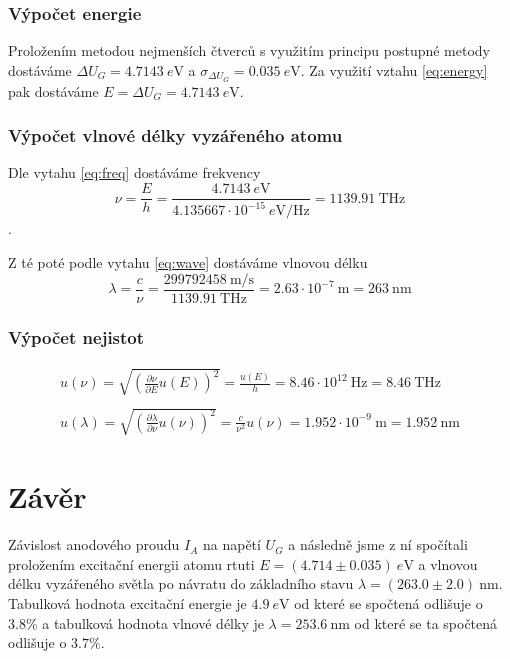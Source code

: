 \documentclass[titlepage]{article}
\begin{document}
\subsubsection{Výpočet energie}
Proložením metodou nejmenších čtverců s využitím principu postupné metody dostáváme $\Delta U_G = 4.7143\ \si{e\volt}$ a $\sigma_{\Delta U_G} =  0.035\ \si{e\volt}$. Za využití vztahu \eqref{eq:energy} pak dostáváme $E = \Delta U_G = 4.7143\ \si{e\volt}$.

\subsubsection{Výpočet vlnové délky vyzářeného atomu}
Dle vytahu \eqref{eq:freq} dostáváme frekvency
$$
\nu = \frac{E}{h} = \frac{4.7143\ \si{e\volt}}{4.135667 \cdot 10^{-15}\ \si{e\volt\per\hertz}}=1139.91\ \si{\tera\hertz}
$$.

Z té poté podle vytahu \eqref{eq:wave} dostáváme vlnovou délku
$$
\lambda = \frac{c}{\nu} = \frac{299792458\ \si{\meter\per\second}}{1139.91\ \si{\tera\hertz}} = 2.63 \cdot 10^{-7}\ \si{\meter} = 263\ \si{\nano\meter}
$$
\subsubsection{Výpočet nejistot}

\begin{gather*}
 u(\nu) = \sqrt{(\frac{ \partial \nu}{\partial E}u(E))^2} = \frac{u(E)}{h} = 8.46 \cdot 10^{12}\ \si{\hertz} = 8.46\ \si{\tera\hertz}\\
 \\
u(\lambda) = \sqrt{(\frac{ \partial \lambda}{\partial \nu}u(\nu))^2} = \frac{c}{\nu ^ 2}u(\nu) = 1.952 \cdot 10^{-9}\ \si{\meter} = 1.952\ \si{\nano\meter}
\end{gather*}

\section{Závěr}
Závislost anodového proudu $I_A$ na napětí $U_G$ a následně jsme z ní spočítali proložením excitační energii atomu rtuti $E = (4.714 \pm 0.035)\  \si{e\volt}$ a vlnovou délku vyzářeného světla po návratu do základního stavu $\lambda = (263.0 \pm 2.0)\ \si{\nano\meter}$. Tabulková hodnota excitační energie je $4.9\ \si{e\volt}$ od které se spočtená odlišuje o $3.8\%$ a tabulková hodnota vlnové délky je $\lambda = 253.6\ \si{\nano\meter}$ od které se ta spočtená odlišuje o $3.7\%$.
\end{document}
